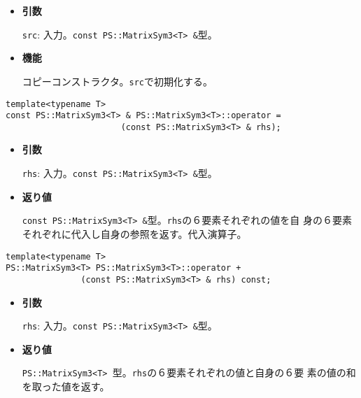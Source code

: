 \begin{itemize}

\item{{\bf 引数}}

{\tt src}: 入力。{\tt const PS::MatrixSym3<T> \&}型。

\item{{\bf 機能}}

コピーコンストラクタ。{\tt src}で初期化する。

\end{itemize}


\begin{screen}
\begin{verbatim}
template<typename T>
const PS::MatrixSym3<T> & PS::MatrixSym3<T>::operator = 
                       (const PS::MatrixSym3<T> & rhs);
\end{verbatim}
\end{screen}

\begin{itemize}

\item{{\bf 引数}}

{\tt rhs}: 入力。{\tt const PS::MatrixSym3<T> \&}型。

\item{{\bf 返り値}}

{\tt const PS::MatrixSym3<T> \&}型。{\tt rhs}の６要素それぞれの値を自
身の６要素それぞれに代入し自身の参照を返す。代入演算子。

\end{itemize}


\begin{screen}
\begin{verbatim}
template<typename T>
PS::MatrixSym3<T> PS::MatrixSym3<T>::operator + 
               (const PS::MatrixSym3<T> & rhs) const;
\end{verbatim}
\end{screen}

\begin{itemize}

\item{{\bf 引数}}

{\tt rhs}: 入力。{\tt const PS::MatrixSym3<T> \&}型。

\item{{\bf 返り値}}

{\tt PS::MatrixSym3<T> }型。{\tt rhs}の６要素それぞれの値と自身の６要
素の値の和を取った値を返す。

\end{itemize}

